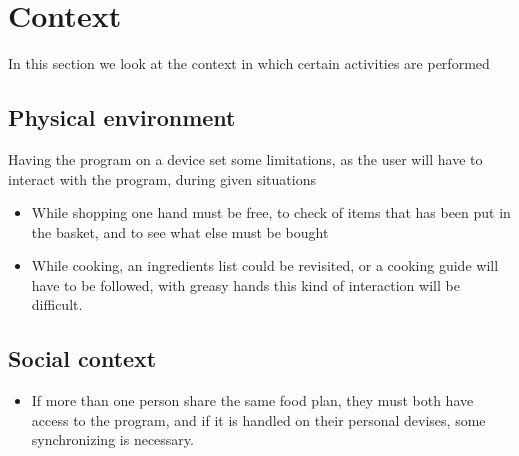 \section{Context}
In this section we look at the context in which certain activities are performed
\subsection{Physical environment}
Having the program on a device set some limitations, as the user will have to interact with the program, during given situations
\begin{itemize}
\item While shopping one hand must be free, to check of items that has been put in the basket, and to see what else must be bought
\item While cooking, an ingredients list could be revisited, or a cooking guide will have to be followed, with greasy hands this kind of interaction will be difficult.
\end{itemize}
\subsection{Social context}
\begin{itemize}
\item If more than one person share the same food plan, they must both have access to the program, and if it is handled on their personal devises, some synchronizing is necessary.
\end{itemize}
